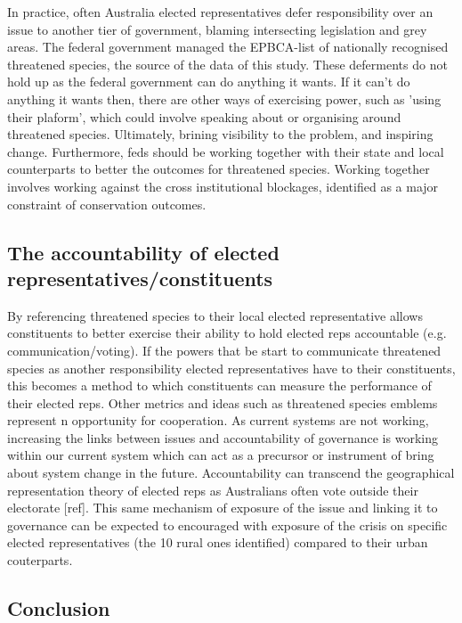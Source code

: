 \documentclass[a4paper,11pt]{article}
\begin{document}
In practice, often Australia elected representatives defer responsibility over an issue to another tier of government, blaming intersecting legislation and grey areas. The federal government managed the EPBCA-list of nationally recognised threatened species, the source of the data of this study. These deferments do not hold up as the federal government can do anything it wants. If it can't do anything it wants then, there are other ways of exercising power, such as 'using their plaform', which could involve speaking about or organising around threatened species. Ultimately, brining visibility to the problem, and inspiring change.
Furthermore, feds should be working together with their state and local counterparts to better the outcomes for threatened species. Working together involves working against the cross institutional blockages, identified as a major constraint of conservation outcomes.

\subsection{The accountability of elected representatives/constituents}

By referencing threatened species to their local elected representative allows constituents to better exercise their ability to hold elected reps accountable (e.g. communication/voting). If the powers that be start to communicate threatened species as another responsibility elected representatives have to their constituents, this becomes a method to which constituents can measure the performance of their elected reps. Other metrics and ideas such as threatened species emblems represent n opportunity for cooperation.
As current systems are not working, increasing the links between issues and accountability of governance is working within our current system which can act as a precursor or instrument of bring about system change in the future.
Accountability can transcend the geographical representation theory of elected reps as Australians often vote outside their electorate [ref].
This same mechanism of exposure of the issue and linking it to governance can be expected to encouraged with exposure of the crisis on specific elected representatives (the 10 rural ones identified) compared to their urban couterparts.


\subsection{Conclusion}
\end{document}
